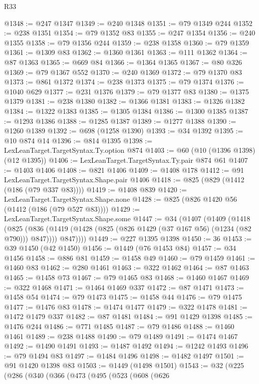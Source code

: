 \begin{lexlean}{R33}
\begin{coremodule}
@1348 := @247 @1347
@1349 := @240 @1348
@1351 := @79 @1349 @244
@1352 := @238 @1351
@1354 := @79 @1352 @83
@1355 := @247 @1354
@1356 := @240 @1355
@1358 := @79 @1356 @244
@1359 := @238 @1358
@1360 := @79 @1359
@1361 := @1309 @83
@1362 := @1360 @1361
@1363 := @111 @1362
@1364 := @87 @1363
@1365 := @669 @84
@1366 := @1364 @1365
@1367 := @80 @326
@1369 := @79 @1367 @552
@1370 := @240 @1369
@1372 := @79 @1370 @83
@1373 := @861 @1372
@1374 := @238 @1373
@1375 := @79 @1374
@1376 := @1040 @629
@1377 := @231 @1376
@1379 := @79 @1377 @83
@1380 := @1375 @1379
@1381 := @238 @1380
@1382 := @1366 @1381
@1383 := @1326 @1382
@1384 := @1322 @1383
@1385 := @1305 @1384
@1386 := @1300 @1385
@1387 := @1293 @1386
@1388 := @1285 @1387
@1389 := @1277 @1388
@1390 := @1260 @1389
@1392 := @698 (@1258 @1390)
@1393 := @34 @1392
@1395 := @10 @874 @14
@1396 := @814 @1395
@1398 := LexLeanTarget.TargetSyntax.Ty.option @874
@1403 := @60 (@10 (@1396 @1398) (@12 @1395))
@1406 := LexLeanTarget.TargetSyntax.Ty.pair @874 @61
@1407 := @1403 @1406
@1408 := @821 @1406
@1409 := @1408 @178
@1412 := @91 LexLeanTarget.TargetSyntax.Shape.pair @1406
@1418 := @825 (@829 (@1412 (@186 (@79 @337 @83))))
@1419 := @1408 @839
@1420 := LexLeanTarget.TargetSyntax.Shape.none
@1428 := @825 (@826 @1420 @56 (@1412 (@186 (@79 @527 @83))))
@1429 := LexLeanTarget.TargetSyntax.Shape.some
@1447 := @34
    (@1407
      (@1409
        (@1418
          (@825
            (@836 (@1419 (@1428 (@825 (@826 @1429 (@37 @167 @56) (@1234 (@82 @790))) @847))))
            @847))))
@1449 := @227 @1395 @1398
@1450 := 36
@1453 := @39 @1450 (@42 @1450)
@1456 := @1449 (@76 @1453 @84)
@1457 := @34 @1456
@1458 := @886 @81
@1459 := @1458 @49
@1460 := @79 @1459
@1461 := @1460 @83
@1462 := @280 @1461
@1463 := @322 @1462
@1464 := @87 @1463
@1465 := @1458 @73
@1467 := @79 @1465 @83
@1468 := @1460 @1467
@1469 := @322 @1468
@1471 := @1464 @1469 @337
@1472 := @87 @1471
@1473 := @1458 @54
@1474 := @79 @1473
@1475 := @1458 @44
@1476 := @79 @1475
@1477 := @1476 @83
@1478 := @1474 @1477
@1479 := @322 @1478
@1481 := @1472 @1479 @337
@1482 := @87 @1481
@1484 := @91 @1429 @1398
@1485 := @1476 @244
@1486 := @771 @1485
@1487 := @79 @1486
@1488 := @1460 @1461
@1489 := @238 @1488
@1490 := @79 @1489
@1491 := @1474 @1467
@1492 := @1490 @1491
@1493 := @1487 @1492
@1494 := @1242 @1493
@1496 := @79 @1494 @83
@1497 := @1484 @1496
@1498 := @1482 @1497
@1501 := @91 @1420 @1398 @83
@1503 := @1449 (@1498 @1501)
@1543 := @32
    (@225
      (@286
        (@340
          (@366
            (@473
              (@495
                (@523
                  (@608
                    (@626

\end{coremodule}
\end{lexlean}
